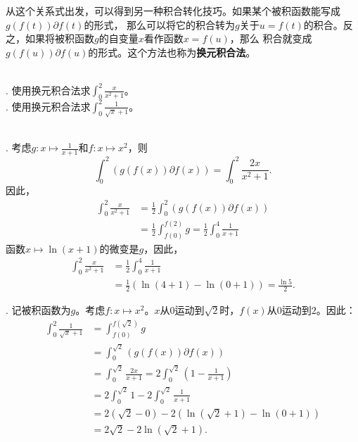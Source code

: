 \documentclass[12pt,UTF8]{ctexbook}
\begin{document}
从这个关系式出发，可以得到另一种积合转化技巧。如果某个被积函数能写成$g(f(t)) \partial f (t)$的形式，
那么可以将它的积合转为$g$关于$u = f(t)$的积合。反之，如果将被积函数$g$的自变量$x$看作函数$x = f(u)$，那么
积合就变成$g(f(u)) \partial f (u)$的形式。这个方法也称为\textbf{换元积合法}。

\begin{et}
    \mbox{} \\
    . 使用换元积合法求$\int_0^2 \frac{x}{x^2 + 1}$。 \\
    . 使用换元积合法求$\int_0^2 \frac{1}{\sqrt{x} + 1}$。
\end{et}

\begin{so}
    \mbox{} \\
    . 考虑$g: x\mapsto \frac{1}{x + 1}$和$f: x\mapsto x^2$，则
    $$ \int_0^2 \left( g(f(x)) \partial f (x) \right) = \int_0^2 \frac{2x}{x^2 + 1}. $$
    因此，
    \begin{align*}
        \int_0^2 \frac{x}{x^2 + 1} &= \frac{1}{2} \int_0^2 \left( g(f(x)) \partial f (x) \right) \\
        &= \frac{1}{2}\int_{f(0)}^{f(2)} g = \frac{1}{2}\int_0^4 \frac{1}{x + 1} 
    \end{align*}
    函数$x\mapsto \ln{(x + 1)}$的微变是$g$，因此，
    \begin{align*}
        \int_0^2 \frac{x}{x^2 + 1} &= \frac{1}{2}\int_0^4 \frac{1}{x + 1} \\
        &= \frac{1}{2}\left(\ln{(4 + 1)} - \ln{(0 + 1)}\right) = \frac{\ln{5}}{2}.
    \end{align*}

    . 记被积函数为$g$。考虑$f: x\mapsto x^2$。$x$从$0$运动到$\sqrt{2}$时，$f(x)$从$0$运动到$2$。因此：
    \begin{align*}
        \int_0^2 \frac{1}{\sqrt{x} + 1} &= \int_{f(0)}^{f(\sqrt{2})} g \\
        &= \int_0^{\sqrt{2}} \left( g(f(x)) \partial f (x) \right) \\
        &= \int_0^{\sqrt{2}} \frac{2x}{x + 1} = 2\int_0^{\sqrt{2}} \left( 1 - \frac{1}{x + 1} \right) \\
        &= 2\int_0^{\sqrt{2}} 1 - 2\int_0^{\sqrt{2}} \frac{1}{x + 1} \\
        &= 2(\sqrt{2} - 0) - 2 \left(\ln{(\sqrt{2} + 1)} - \ln{(0 + 1)}\right) \\
        &= 2\sqrt{2} - 2\ln{(\sqrt{2} + 1)}.
    \end{align*}
\end{so}
\end{document}
